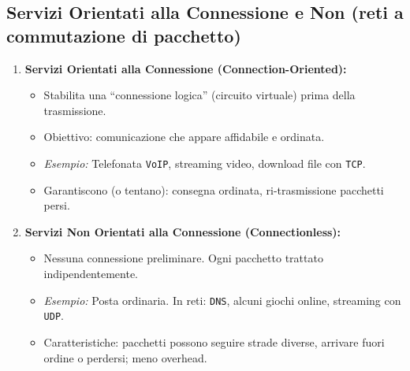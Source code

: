 \subsection{Servizi Orientati alla Connessione e Non (reti a commutazione di pacchetto)}
\begin{enumerate}
    \item \textbf{Servizi Orientati alla Connessione (Connection-Oriented):}
    \begin{itemize}
        \item Stabilita una “connessione logica” (circuito virtuale) prima della trasmissione.
        \item Obiettivo: comunicazione che appare affidabile e ordinata.
        \item \textit{Esempio:} Telefonata \texttt{VoIP}, streaming video, download file con \texttt{TCP}.
        \item Garantiscono (o tentano): consegna ordinata, ri-trasmissione pacchetti persi.
    \end{itemize}
    \item \textbf{Servizi Non Orientati alla Connessione (Connectionless):}
    \begin{itemize}
        \item Nessuna connessione preliminare. Ogni pacchetto trattato indipendentemente.
        \item \textit{Esempio:} Posta ordinaria. In reti: \texttt{DNS}, alcuni giochi online, streaming con \texttt{UDP}.
        \item Caratteristiche: pacchetti possono seguire strade diverse, arrivare fuori ordine o perdersi; meno overhead.
    \end{itemize}
\end{enumerate}

